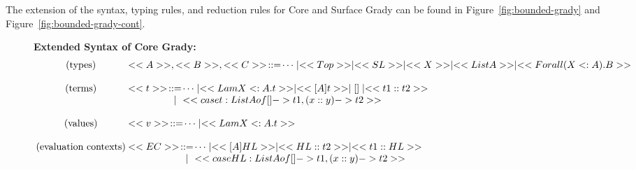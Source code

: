 The extension of the syntax, typing rules, and reduction rules for
Core and Surface Grady can be found in Figure~\ref{fig:bounded-grady}
and Figure~\ref{fig:bounded-grady-cont}.  
\begin{figure}
  \begin{mdframed} \footnotesize
    \textbf{Extended Syntax of Core Grady:}\\
    \[
      \setlength{\arraycolsep}{0.6pt}
      \begin{array}{cl}      
        \begin{array}{l}
          \text{(types)}\\
        \end{array}     &
        \begin{array}{lcl}
          <<A>>,<<B>>,<<C>> & ::= & \cdots \mid <<Top>> \mid <<SL>> \mid <<X>> \mid <<List A>> \mid <<Forall (X <: A).B>> \\
        \end{array}\\\\
                
        \begin{array}{l}
          \text{(terms)}\\\\
        \end{array}     &
        \begin{array}{lcl}
          <<t>> & ::= & \cdots \mid <<Lam X <: A .t >> \mid << [A]t >> \mid [] \mid <<t1 :: t2>> \\
                & \mid & <<case t : List A of [] -> t1, (x :: y) -> t2>>\\
        \end{array}
        \\\\
        \begin{array}{l}
          \text{(values)}\\
        \end{array}     &
        \begin{array}{lcl}
          <<v>> & ::=  & \cdots \mid <<Lam X <: A.t>>\\                
        \end{array}
        \\\\
        \begin{array}{lll}
          \text{(evaluation contexts)}\\\\
        \end{array}  &
        \begin{array}{lcl}
          <<EC>> & ::=  & \cdots \mid << [A]HL >> \mid << HL :: t2>> \mid <<t1 :: HL>>\\
                 & \mid & <<case HL : List A of [] -> t1, (x::y) -> t2>>\\
        \end{array}\\\\
        

\end{array}\]
\end{mdframed}
\end{figure}
